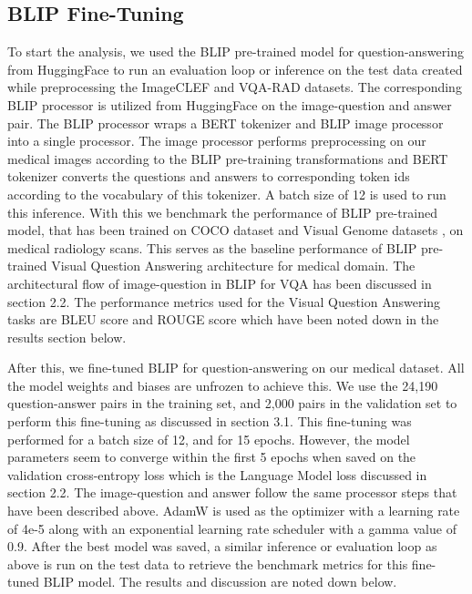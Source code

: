 \documentclass[pdflatex,sn-mathphys-num]{sn-jnl}%
\begin{document}
\subsection{BLIP Fine-Tuning}\label{subsec3.2}
To start the analysis, we used the BLIP pre-trained model for question-answering from HuggingFace to run an evaluation loop or inference on the test data created while preprocessing the ImageCLEF and VQA-RAD datasets. The corresponding BLIP processor is utilized from HuggingFace on the image-question and answer pair. The BLIP processor wraps a BERT tokenizer and BLIP image processor into a single processor. The image processor performs preprocessing on our medical images according to the BLIP pre-training transformations and BERT tokenizer converts the questions and answers to corresponding token ids according to the vocabulary of this tokenizer. A batch size of 12 is used to run this inference. With this we benchmark the performance of BLIP pre-trained model, that has been trained on COCO dataset and Visual Genome datasets \cite{krishna2016visual}, on medical radiology scans. This serves as the baseline performance of BLIP pre-trained Visual Question Answering architecture for medical domain. The architectural flow of image-question in BLIP for VQA has been discussed in section 2.2. The performance metrics used for the Visual Question Answering tasks are BLEU score \cite{10.3115/1073083.1073135} and ROUGE score \cite{lin-2004-rouge} which have been noted down in the results section below. 

After this, we fine-tuned BLIP for question-answering on our medical dataset. All the model weights and biases are unfrozen to achieve this. We use the 24,190 question-answer pairs in the training set, and 2,000 pairs in the validation set to perform this fine-tuning as discussed in section 3.1. This fine-tuning was performed for a batch size of 12, and for 15 epochs. However, the model parameters seem to converge within the first 5 epochs when saved on the validation cross-entropy loss which is the Language Model loss discussed in section 2.2. The image-question and answer follow the same processor steps that have been described above. AdamW \cite{loshchilov2019decoupled} is used as the optimizer with a learning rate of 4e-5 along with an exponential learning rate scheduler with a gamma value of 0.9. After the best model was saved, a similar inference or evaluation loop as above is run on the test data to retrieve the benchmark metrics for this fine-tuned BLIP model. The results and discussion are noted down below.
\end{document}
